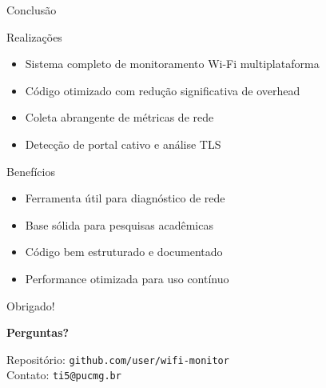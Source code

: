 \documentclass[aspectratio=169]{beamer}
\begin{document}
\begin{frame}{Conclusão}
\begin{block}{Realizações}
\begin{itemize}
    \item Sistema completo de monitoramento Wi-Fi multiplataforma
    \item Código otimizado com redução significativa de overhead
    \item Coleta abrangente de métricas de rede
    \item Detecção de portal cativo e análise TLS
\end{itemize}
\end{block}

\vspace{0.5cm}

\begin{exampleblock}{Benefícios}
\begin{itemize}
    \item Ferramenta útil para diagnóstico de rede
    \item Base sólida para pesquisas acadêmicas
    \item Código bem estruturado e documentado
    \item Performance otimizada para uso contínuo
\end{itemize}
\end{exampleblock}
\end{frame}

\begin{frame}[standout]
\Huge{Obrigado!}

\vspace{1cm}

\normalsize
\textbf{Perguntas?}

\vspace{0.5cm}

\small
Repositório: \texttt{github.com/user/wifi-monitor} \\
Contato: \texttt{ti5@pucmg.br}
\end{frame}
\end{document}
